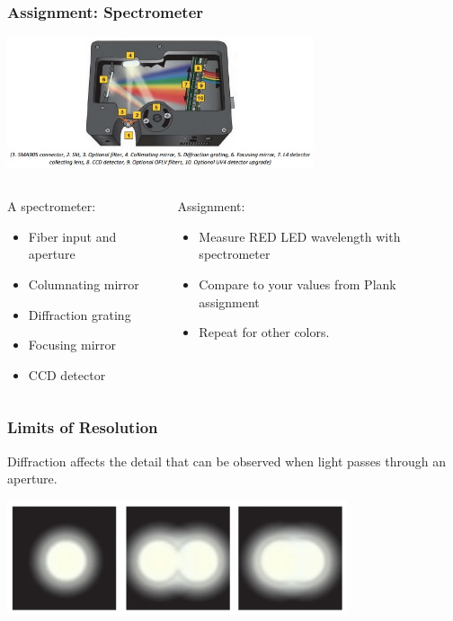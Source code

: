 \documentclass{beamer}
\begin{document}
\begin{frame}\frametitle{Assignment: Spectrometer}
\begin{center}
\includegraphics[width=9cm]{fig/spectrometer.jpg}
\end{center}
\begin{columns}
\begin{column}{5cm}
A spectrometer:
\begin{itemize}
\item Fiber input and aperture
\item Columnating mirror
\item Diffraction grating
\item Focusing mirror
\item CCD detector
\end{itemize}

\end{column}
\begin{column}{6cm}
Assignment:
\begin{itemize}
\item Measure RED LED wavelength with spectrometer
\item Compare to your values from Plank assignment
\item Repeat for other colors.
\end{itemize}
\end{column}
\end{columns}
\end{frame}


\begin{frame}\frametitle{Limits of Resolution}

Diffraction affects the detail that can be observed when light passes through an aperture.

\vspace{0.5cm}

\begin{center}
\includegraphics[width=10cm]{fig/rayleigh1.jpg}
\end{center}

\end{frame}
\end{document}
